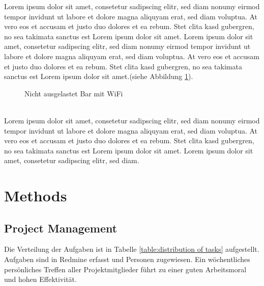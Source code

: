 \documentclass[a4paper]{spie}  %
\begin{document}
Lorem ipsum dolor sit amet, consetetur sadipscing elitr, sed diam nonumy eirmod tempor invidunt ut labore et dolore magna aliquyam erat, sed diam voluptua. At vero eos et accusam et justo duo dolores et ea rebum. Stet clita kasd gubergren, no sea takimata sanctus est Lorem ipsum dolor sit amet. Lorem ipsum dolor sit amet, consetetur sadipscing elitr, sed diam nonumy eirmod tempor invidunt ut labore et dolore magna aliquyam erat, sed diam voluptua. At vero eos et accusam et justo duo dolores et ea rebum. Stet clita kasd gubergren, no sea takimata sanctus est Lorem ipsum dolor sit amet.(siehe Abbildung \ref{fig:bar2}). 
\begin{figure}[h!]
	\centering
		\caption{Nicht ausgelastet Bar mit WiFi}
		\label{fig:bar2}
\end{figure}
\\
Lorem ipsum dolor sit amet, consetetur sadipscing elitr, sed diam nonumy eirmod tempor invidunt ut labore et dolore magna aliquyam erat, sed diam voluptua. At vero eos et accusam et justo duo dolores et ea rebum. Stet clita kasd gubergren, no sea takimata sanctus est Lorem ipsum dolor sit amet. Lorem ipsum dolor sit amet, consetetur sadipscing elitr, sed diam.

\section{Methods}
\subsection{Project Management}
Die Verteilung der Aufgaben ist in Tabelle \ref{table:distribution of tasks} aufgestellt.
Aufgaben sind in Redmine erfasst und Personen zugewiesen. Ein wöchentliches persönliches Treffen aller Projektmitglieder führt zu einer guten Arbeitsmoral und hohen Effektivität. 
\end{document}
